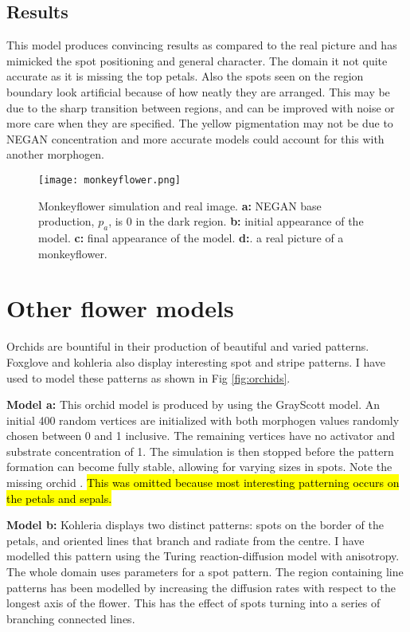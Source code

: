 \subsection*{Results}
This model produces convincing results as compared to the real picture and has mimicked the spot positioning and general character. The domain it not quite accurate as it is missing the top petals. Also the spots seen on the region boundary look artificial because of how neatly they are arranged. This may be due to the sharp transition between regions, and can be improved with noise or more care when they are specified. The yellow pigmentation may not be due to NEGAN concentration and more accurate models could account for this with another morphogen.

\begin{figure}[ht]
	\centering
	\texttt{[image: monkeyflower.png]}
	\caption{Monkeyflower simulation and real image. \textbf{a:} NEGAN base production, $p_a$, is 0 in the dark region. \textbf{b:} initial appearance of the model. \textbf{c:} final appearance of the model. \textbf{d:}. a real picture of a monkeyflower.}
	\label{fig:monkeyflower}
\end{figure}

\section{Other flower models}
Orchids are bountiful in their production of beautiful and varied patterns. Foxglove and kohleria also display interesting spot and stripe patterns. I have used \ProgramName{} to model these patterns as shown in Fig \ref{fig:orchids}. 

\textbf{Model a:} 
This orchid model is produced by using the GrayScott model. An initial 400 random vertices are initialized with both morphogen values randomly chosen between 0 and 1 inclusive. The remaining vertices have no activator and substrate concentration of 1. The simulation is then stopped before the pattern formation can become fully stable, allowing for varying sizes in spots. Note the missing orchid . \hl{This was omitted because most interesting patterning occurs on the petals and sepals.}

\textbf{Model b:}
Kohleria displays two distinct patterns: spots on the border of the petals, and oriented lines that branch and radiate from the centre. I have modelled this pattern using the Turing reaction-diffusion model with anisotropy. The whole domain uses parameters for a spot pattern. The region containing line patterns has been modelled by increasing the diffusion rates with respect to the longest axis of the flower. This has the effect of spots turning into a series of branching connected lines.


